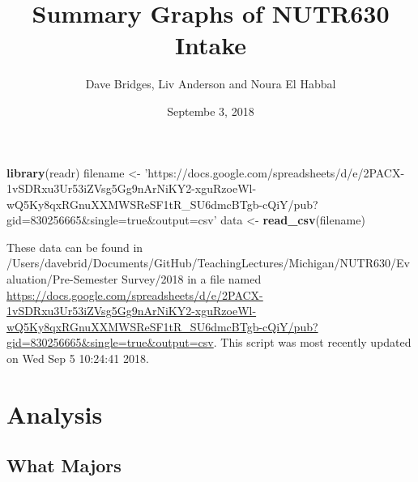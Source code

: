 \documentclass[]{article}
\title{Summary Graphs of NUTR630 Intake}
\author{Dave Bridges, Liv Anderson and Noura El Habbal}
\date{Septembe 3, 2018}
\newenvironment{Shaded}{\begin{snugshade}}{\end{snugshade}}
\newcommand{\KeywordTok}[1]{\textcolor[rgb]{0.13,0.29,0.53}{\textbf{#1}}}
\newcommand{\StringTok}[1]{\textcolor[rgb]{0.31,0.60,0.02}{#1}}
\newcommand{\NormalTok}[1]{#1}
\begin{document}
\maketitle

{
\setcounter{tocdepth}{2}
\tableofcontents
}
\begin{Shaded}
\begin{Highlighting}[]
\KeywordTok{library}\NormalTok{(readr)}
\NormalTok{filename <-}\StringTok{ 'https://docs.google.com/spreadsheets/d/e/2PACX-1vSDRxu3Ur53iZVsg5Gg9nArNiKY2-xguRzoeWl-wQ5Ky8qxRGnuXXMWSReSF1tR_SU6dmcBTgb-cQiY/pub?gid=830256665&single=true&output=csv'}
\NormalTok{data <-}\StringTok{ }\KeywordTok{read_csv}\NormalTok{(filename)}
\end{Highlighting}
\end{Shaded}

These data can be found in
/Users/davebrid/Documents/GitHub/TeachingLectures/Michigan/NUTR630/Evaluation/Pre-Semester
Survey/2018 in a file named
\url{https://docs.google.com/spreadsheets/d/e/2PACX-1vSDRxu3Ur53iZVsg5Gg9nArNiKY2-xguRzoeWl-wQ5Ky8qxRGnuXXMWSReSF1tR_SU6dmcBTgb-cQiY/pub?gid=830256665\&single=true\&output=csv}.
This script was most recently updated on Wed Sep 5 10:24:41 2018.

\section{Analysis}\label{analysis}

\subsection{What Majors}\label{what-majors}
\end{document}
